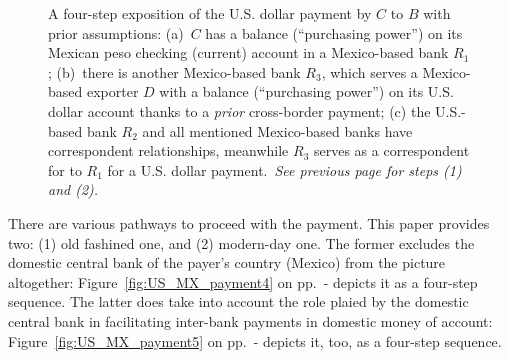 \begin{figure}[!ht]
\caption[A four-step exposition of the U.S. dollar payment by $C$ to $B$, steps (3) and (4)]%
{A four-step exposition of the U.S. dollar payment by $C$ to $B$ with prior assumptions: (a)~$C$ has a balance (``purchasing power'') on its Mexican peso checking (current) account in a Mexico-based bank $R_1$; (b)~there is another Mexico-based bank $R_3$, which serves a Mexico-based exporter $D$ with a balance (``purchasing power'') on its U.S. dollar account thanks to a \textit{prior} cross-border payment; (c) the U.S.-based bank $R_2$ and all mentioned Mexico-based banks have correspondent relationships, meanwhile $R_3$ serves as a correspondent for to $R_1$ for a U.S. dollar payment.~\textit{See previous page for steps (1) and (2).}}%
\label{fig:US_MX_payment4_}
\end{figure}

There are various pathways to proceed with the payment. This paper provides two: (1) old fashined one, and (2) modern-day one. The former excludes the domestic central bank of the payer's country (Mexico) from the picture altogether: Figure~\ref{fig:US_MX_payment4} on pp.~\pageref{fig:US_MX_payment4}-\pageref{fig:US_MX_payment4_} depicts it as a four-step sequence. The latter does take into account the role plaied by the domestic central bank in facilitating inter-bank payments in domestic money of account: Figure~\ref{fig:US_MX_payment5} on pp.~\pageref{fig:US_MX_payment5}-\pageref{fig:US_MX_payment5_} depicts it, too, as a four-step sequence.

